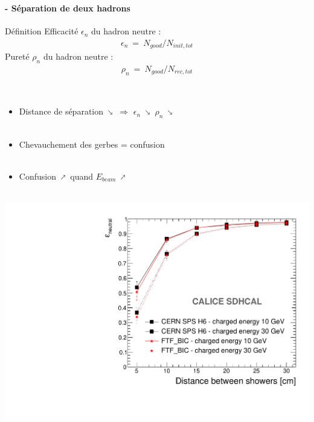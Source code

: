\documentclass[8pt]{beamer}
\makeatletter
\newcommand{\fixed@sra}{$\vrule height 2\fontdimen22\textfont2 width 0pt\shortrightarrow$}
\newcommand{\shortarrow}[1]{%
  \mathrel{\text{\rotatebox[origin=c]{\numexpr#1*45}{\fixed@sra}}}
}
\makeatother
\begin{document}
  \begin{frame}
  \frametitle{\secname}
  \framesubtitle{\subsecname - Séparation de deux hadrons}
    \begin{minipage}{0.48\linewidth}
      \begin{block}{Définition}
        Efficacité $\epsilon_n$ du hadron neutre :
        \begin{align*}
          \epsilon_n~=~N_{good} / N_{init,tot}
        \end{align*}
        Pureté $\rho_n$ du hadron neutre :
        \begin{align*}
          \rho_n~=~N_{good} / N_{rec,tot}
        \end{align*}
      \end{block}
      ~ \\
      \begin{itemize}
        \item Distance de séparation $\shortarrow{7}$ $\Rightarrow$ $\epsilon_n$ $\shortarrow{7}$ $\rho_n$ $\shortarrow{7}$ \\
        ~ \\
        \item Chevauchement des gerbes = confusion \\
        ~ \\
        \item Confusion $\shortarrow{1}$ quand $E_{beam}$ $\shortarrow{1}$
      \end{itemize}
    \end{minipage}
    \begin{minipage}{0.48\linewidth}
      \begin{center}
        ~~~~~~~~~~~~\centering \includegraphics[width=0.8\linewidth]{OverlayEvent_Efficiency.pdf} \\

\end{center}
\end{minipage}
\end{frame}
\end{document}
